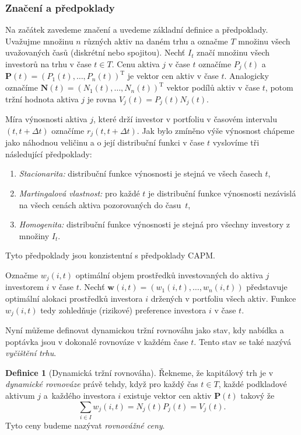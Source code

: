 \documentclass[a4paper,12pt]{report}
\theoremstyle{definition} \newtheorem{definice}[veta]{Definice}
\theoremstyle{remark}
\begin{document}
\subsubsection{Značení a předpoklady}
Na začátek zavedeme značení a  uvedeme základní definice a předpoklady. 
Uvažujme množinu $n$ různých aktiv na daném trhu a označme $T$ množinu všech uvažovaných časů (diskrétní nebo spojitou).
Nechť $I_t$ značí množinu všech investorů na trhu v čase $t\in T$.
Cenu aktiva $j$ v čase $t$ označíme $P_j(t)$ a $\boldsymbol{P}(t)=(P_1(t),\dots,P_n(t))^\mathrm{T}$ je vektor cen aktiv v čase $t$.
Analogicky označíme $\boldsymbol{N}(t)=(N_1(t),\dots,N_n(t))^\mathrm{T}$ vektor podílů aktiv v čase $t$, potom tržní hodnota aktiva $j$ je rovna $V_j(t)=P_j(t)N_j(t)$.

Míra výnosnosti aktiva $j$, které drží investor v portfoliu v časovém intervalu $(t,t+\Delta t)$ označíme $r_j(t,t+\Delta t)$.
Jak bylo zmíněno výše výnosnost chápeme jako náhodnou veličinu a o její distribuční funkci v čase $t$ vyslovíme tři následující předpoklady:
\begin{enumerate}
\item \label{Stacionarita} \textit{Stacionarita:} distribuční funkce výnosnosti  je stejná ve všech časech $t$,                                                                            
\item \label{Martingalvl} \textit{Martingalová vlastnost:} pro každé $t$ je distribuční funkce výnosnosti nezávislá na všech cenách aktiva pozorovaných do času~$t$,
\item \label{Homogenita} \textit{Homogenita:} distribuční funkce výnosnosti je stejná pro všechny investory z množiny $I_t$. 
\end{enumerate} 
Tyto předpoklady jsou konzistentní s předpoklady CAPM.

Označme $w_{j}(i,t)$ optimální objem prostředků investovaných do aktiva $j$ investorem $i$ v čase $t$.
Nechť $\boldsymbol{w}(i,t)=(w_{1}(i,t),\dots,w_{n}(i,t))$ představuje optimální alokaci prostředků investora $i$ držených v portfoliu všech aktiv.
Funkce $w_{j}(i,t)$ tedy zohledňuje (rizikové) preference investora $i$ v čase $t$.
  
Nyní můžeme definovat dynamickou tržní rovnováhu jako stav, kdy  nabídka a poptávka jsou v dokonalé rovnováze v každém čase $t$.
Tento stav se také nazývá \textit{vyčištění trhu}.
         
\begin{definice}[Dynamická tržní rovnováha]
Řekneme, že kapitálový trh je v \textit{dynamické rovnováze} právě tehdy, když pro každý čas $t\in T$, každé podkladové aktivum $j$ a~každého investora $i$ existuje vektor cen aktiv $\boldsymbol{P}(t)$ takový že
$$\sum_{i\in I} w_{j}(i,t)=N_j(t)P_j(t)=V_j(t).$$
Tyto ceny budeme nazývat \textit{rovnovážné ceny}.
\end{definice}
\end{document}
